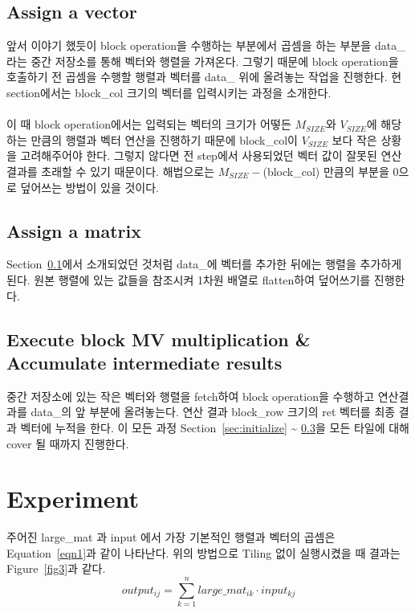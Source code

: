 \documentclass{article}
\begin{document}
\subsection{Assign a vector}
\label{sec:vector}
앞서 이야기 했듯이 block operation을 수행하는 부분에서 곱셈을 하는 부분을 data\_라는 중간 저장소를 통해 벡터와 행렬을 가져온다. 그렇기 때문에 block operation을 호출하기 전 곱셈을 수행할 행렬과 벡터를 data\_ 위에 올려놓는 작업을 진행한다. 현 section에서는 block\_col 크기의 벡터를 입력시키는 과정을 소개한다.\\
\\
이 때 block operation에서는 입력되는 벡터의 크기가 어떻든 $M_{SIZE}$와 $V_{SIZE}$에 해당하는 만큼의 행렬과 벡터 연산을 진행하기 때문에 block\_col이 $V_{SIZE}$ 보다 작은 상황을 고려해주어야 한다. 그렇지 않다면 전 step에서 사용되었던 벡터 값이 잘못된 연산 결과를 초래할 수 있기 때문이다. 해법으로는 $M_{SIZE} -$(block\_col) 만큼의 부분을 0으로 덮어쓰는 방법이 있을 것이다.

\subsection{Assign a matrix}
Section~\ref{sec:vector}에서 소개되었던 것처럼 data\_에 벡터를 추가한 뒤에는 행렬을 추가하게 된다. 원본 행렬에 있는 값들을 참조시켜 1차원 배열로 flatten하여 덮어쓰기를 진행한다.

\subsection{Execute block MV multiplication \& Accumulate intermediate results}
\label{sec:accumulate}
중간 저장소에 있는 작은 벡터와 행렬을 fetch하여 block operation을 수행하고 연산결과를 data\_의 앞 부분에 올려놓는다.
연산 결과 block\_row 크기의 ret 벡터를 최종 결과 벡터에 누적을 한다.  이 모든 과정 Section~\ref{sec:initialize} \~{} \ref{sec:accumulate}을 모든 타일에 대해 cover 될 때까지 진행한다.


\section{Experiment}
주어진 large\_mat 과 input 에서 가장 기본적인 행렬과 벡터의 곱셈은 Equation~\ref{eqn1}과 같이 나타난다.
위의 방법으로 Tiling 없이 실행시켰을 때 결과는 Figure~\ref{fig3}과 같다.
\begin{equation}
\label{eqn1}
	output_{ij} = \sum^n_{k=1} large\_mat_{ik} \cdot input_{kj}
\end{equation}
\end{document}

